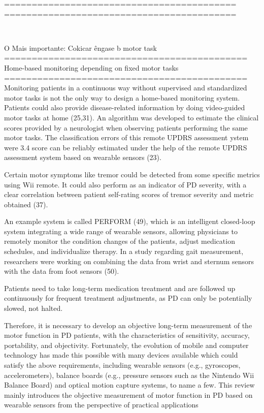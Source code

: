==========================================
==========================================

~\cite{wiiassesspark2016}

O Mais importante: Cokicar êngase b motor task 
============================================
Home-based monitoring depending on fixed motor tasks
============================================
Monitoring patients in a continuous way without supervised and standardized motor tasks is not the only way to design a home-based monitoring system. Patients could also provide disease-related information by doing video-guided motor tasks at home (25,31). An algorithm was developed to estimate the clinical scores provided by a neurologist when observing patients performing the same motor tasks. The classification errors of this remote UPDRS assessment ystem were 3.4%
score can be reliably estimated under the help of the remote UPDRS assessment system based on wearable sensors (23).

Certain motor symptoms like tremor could be detected from some specific metrics using Wii remote. It could also perform as an indicator of PD severity, with a clear correlation between patient self-rating scores of tremor severity and metric obtained (37).

An example system is called PERFORM (49), which is an intelligent closed-loop system integrating a wide range of wearable sensors, allowing physicians to remotely monitor the condition changes of the patients, adjust medication schedules, and individualize therapy. In a study regarding gait measurement, researchers were working on combining the data from wrist and sternum sensors with the data from foot sensors (50).

Patients need to take long-term medication treatment and are followed up continuously for frequent treatment adjustments, as PD can only be potentially slowed, not halted.

Therefore, it is necessary to develop an objective long-term measurement of the motor function in PD patients, with the characteristics of sensitivity, accuracy,
portability, and objectivity. Fortunately, the evolution of mobile and computer technology has made this possible with many devices available which could satisfy the above requirements, including wearable sensors (e.g., gyroscopes, accelerometers), balance boards (e.g., pressure sensors such as the Nintendo Wii Balance Board) and optical motion capture systems, to name a few. This review mainly introduces the objective measurement of motor function in PD based on wearable sensors from the perspective of practical applications


